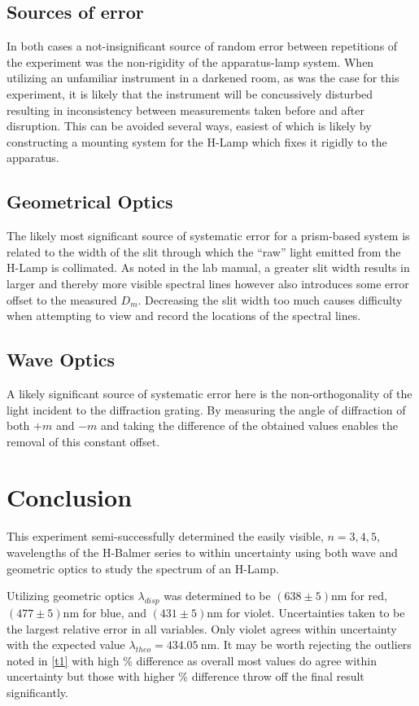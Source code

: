 \documentclass[10pt, twocolumn]{article}
\theoremstyle{definition}
\begin{document}
\subsection{Sources of error}
In both cases a not-insignificant source of random error between repetitions of the experiment was the non-rigidity of the apparatus-lamp system. When utilizing
an unfamiliar instrument in a darkened room, as was the case for this experiment, it is likely that the instrument will be concussively disturbed resulting
in inconsistency between measurements taken before and after disruption. This can be avoided several ways, easiest of which is likely by constructing a mounting
system for the H-Lamp which fixes it rigidly to the apparatus.
\subsection{Geometrical Optics}
The likely most significant source of systematic error for a prism-based system is related to the width of the slit through which the ``raw'' light emitted from
the H-Lamp is collimated. As noted in the lab manual\cite{lab-manual}, a greater slit width results in larger and thereby more visible spectral lines however also introduces some error offset to the measured $D_m$.
Decreasing the slit width too much causes difficulty when attempting to view and record the locations of the spectral lines.
\subsection{Wave Optics} \label{wave-err}
A likely significant source of systematic error here is the non-orthogonality of the light incident to the diffraction grating. By measuring the angle of diffraction
of both $+m$ and $-m$ and taking the difference of the obtained values enables the removal of this constant offset.
\section{Conclusion}
This experiment semi-successfully determined the easily visible, $n=3,4,5$, wavelengths of the H-Balmer series to within uncertainty using both wave and geometric optics to study the spectrum of an H-Lamp.

Utilizing geometric optics $\lambda_{disp}$ was determined to be $(638 \pm 5)\unit{\nano\meter}$ for red, $(477\pm5)\unit{\nano\meter}$ for blue, and $(431\pm5)\unit{\nano\meter}$ for violet. Uncertainties taken
to be the largest relative error in all variables. Only violet agrees within uncertainty with the expected value $\lambda_{theo}=\qty{434.05}{\nano\meter}$. It may be worth rejecting the outliers
noted in \ref{t1} with high \% difference as overall most values do agree within uncertainty but those with higher \% difference throw off the final result significantly.
\end{document}
